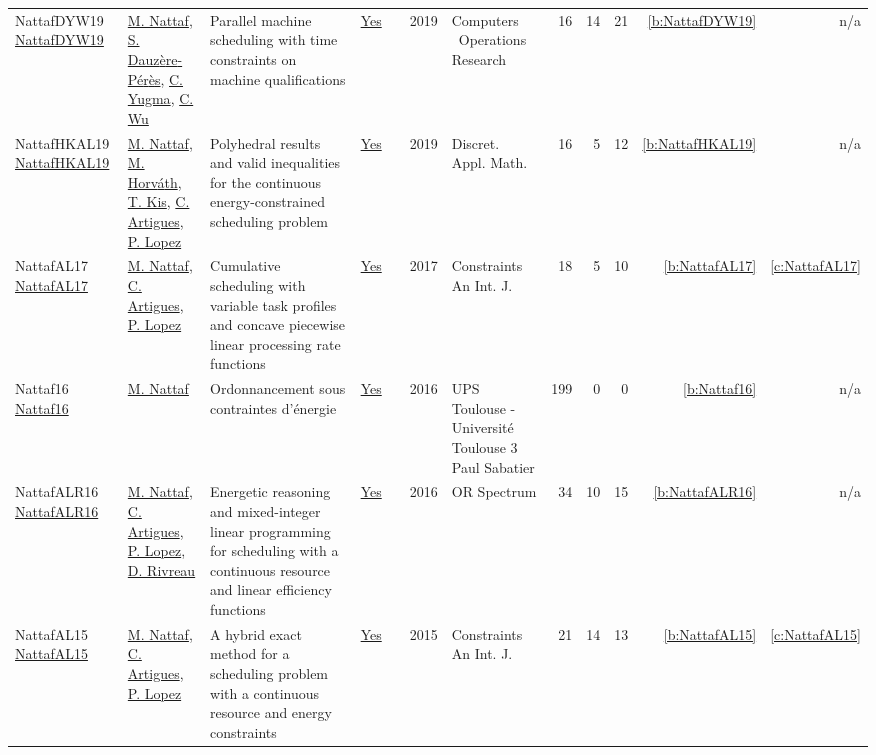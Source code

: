 {\begin{longtable}{>{\raggedright\arraybackslash}p{3cm}>{\raggedright\arraybackslash}p{6cm}>{\raggedright\arraybackslash}p{6.5cm}rrrp{2.5cm}rrrrr}
NattafDYW19 \href{https://doi.org/10.1016/j.cor.2019.03.004}{NattafDYW19} & \hyperref[auth:a81]{M. Nattaf}, \hyperref[auth:a1006]{S. Dauz{\`{e}}re{-}P{\'{e}}r{\`{e}}s}, \hyperref[auth:a1007]{C. Yugma}, \hyperref[auth:a1008]{C. Wu} & Parallel machine scheduling with time constraints on machine qualifications & \href{../works/NattafDYW19.pdf}{Yes} & \cite{NattafDYW19} & 2019 & Computers \  Operations Research & 16 & 14 & 21 & \ref{b:NattafDYW19} & n/a\\
NattafHKAL19 \href{https://doi.org/10.1016/j.dam.2018.11.008}{NattafHKAL19} & \hyperref[auth:a81]{M. Nattaf}, \hyperref[auth:a1009]{M. Horv{\'{a}}th}, \hyperref[auth:a156]{T. Kis}, \hyperref[auth:a6]{C. Artigues}, \hyperref[auth:a3]{P. Lopez} & Polyhedral results and valid inequalities for the continuous energy-constrained scheduling problem & \href{../works/NattafHKAL19.pdf}{Yes} & \cite{NattafHKAL19} & 2019 & Discret. Appl. Math. & 16 & 5 & 12 & \ref{b:NattafHKAL19} & n/a\\
NattafAL17 \href{https://doi.org/10.1007/s10601-017-9271-4}{NattafAL17} & \hyperref[auth:a81]{M. Nattaf}, \hyperref[auth:a6]{C. Artigues}, \hyperref[auth:a3]{P. Lopez} & Cumulative scheduling with variable task profiles and concave piecewise linear processing rate functions & \href{../works/NattafAL17.pdf}{Yes} & \cite{NattafAL17} & 2017 & Constraints An Int. J. & 18 & 5 & 10 & \ref{b:NattafAL17} & \ref{c:NattafAL17}\\
Nattaf16 \href{https://laas.hal.science/tel-01417288}{Nattaf16} & \hyperref[auth:a81]{M. Nattaf} & {Ordonnancement sous contraintes d'{\'e}nergie} & \href{../works/Nattaf16.pdf}{Yes} & \cite{Nattaf16} & 2016 & {UPS Toulouse - Universit{\'e} Toulouse 3 Paul Sabatier} & 199 & 0 & 0 & \ref{b:Nattaf16} & n/a\\
NattafALR16 \href{https://doi.org/10.1007/s00291-015-0423-x}{NattafALR16} & \hyperref[auth:a81]{M. Nattaf}, \hyperref[auth:a6]{C. Artigues}, \hyperref[auth:a3]{P. Lopez}, \hyperref[auth:a991]{D. Rivreau} & Energetic reasoning and mixed-integer linear programming for scheduling with a continuous resource and linear efficiency functions & \href{../works/NattafALR16.pdf}{Yes} & \cite{NattafALR16} & 2016 & {OR} Spectrum & 34 & 10 & 15 & \ref{b:NattafALR16} & n/a\\
NattafAL15 \href{https://doi.org/10.1007/s10601-015-9192-z}{NattafAL15} & \hyperref[auth:a81]{M. Nattaf}, \hyperref[auth:a6]{C. Artigues}, \hyperref[auth:a3]{P. Lopez} & A hybrid exact method for a scheduling problem with a continuous resource and energy constraints & \href{../works/NattafAL15.pdf}{Yes} & \cite{NattafAL15} & 2015 & Constraints An Int. J. & 21 & 14 & 13 & \ref{b:NattafAL15} & \ref{c:NattafAL15}\\
\end{longtable}
}

